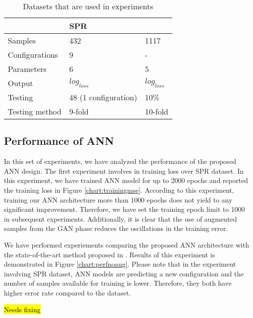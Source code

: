 \documentclass[draft, 10pt]{IEEEtran}
\begin{document}
\begin{table}
\centering
\caption{Datasets that are used in experiments}
\begin{tabular}{l|l|l}
	~ & SPR & \dszero \\\hline
	Samples & 432 & 1117\\
	Configurations & 9 & - \\
	Parameters & 6 & 5 \\
	Output & $log_{loss}$ & $log_{loss}$ \\
	Testing & 48 (1 configuration) & 10\% \\
	Testing method & 9-fold & 10-fold \\
\end{tabular}
\label{tbl:dataset}
\end{table}


\subsection{Performance of ANN}

In this set of experiments, we have analyzed the performance of the proposed ANN design. The first experiment involves in training loss over SPR dataset. In this experiment, we have trained ANN model for up to 2000 epochs and reported the training loss in Figure \ref{chart:trainingmse}. According to this experiment, training our ANN architecture more than 1000 epochs does not yield to any significant improvement. Therefore, we have set the training epoch limit to 1000 in subsequent experiments. Additionally, it is clear that the use of augmented samples from the GAN phase reduces the oscillations in the training error.

We have performed experiements comparing the proposed ANN architecture with the state-of-the-art method proposed in \cite{paper0}. Results of this experiment is demonstrated in Figure \ref{chart:perfnoaug}. Please note that in the experiment involving SPR dataset, ANN models are predicting a new configuration and the number of samples available for training is lower. Therefore, they both have higher error rate compared to the \dszero{} dataset. 


\begin{table*}[h]
\hl{Needs fixing}
\caption{Hyper-parameters chosen for the ANN model, where $\beta_{1}$ and $\beta_{2}$ are a part of Adam parameters}
\centering
{}
\end{table*}
\end{document}
